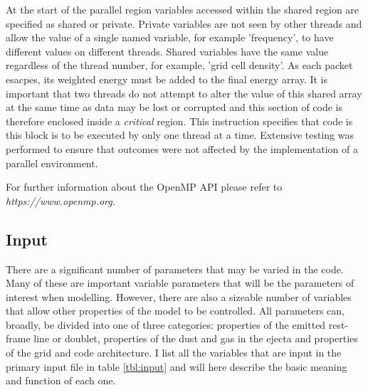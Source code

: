 	At the start of the parallel region variables accessed within the shared region are specified as shared or private.  Private variables are not seen by other threads and allow the value of a single named variable, for example 'frequency', to have different values on different threads.  Shared variables have the same value regardless of the thread number, for example, 'grid cell density'.  As each packet esacpes, its weighted energy must be added to the final energy array.  It is important that two threads do not attempt to alter the value of this shared array at the same time as data may be lost or corrupted and this section of code is therefore enclosed inside a \textit{critical} region.  This instruction specifies that code is this block is to be executed by only one thread at a time.  Extensive testing was performed to ensure that outcomes were not affected by the implementation of a parallel environment.
	
	For further information about the OpenMP API please refer to \textit{https://www.openmp.org}.
		
	\subsection{Input}
	
There are a significant number of parameters that may be varied in the code.  Many of these are important variable parameters that will be the parameters of interest when modelling.  However, there are also a sizeable number of variables that allow other properties of the model to be controlled.  All parameters can, broadly,  be divided into one of three categories:  properties of the emitted rest-frame line or doublet, properties of the dust and gas in the ejecta and properties of the grid and code architecture.  I list all the variables that are input in the primary input file in table \ref{tbl:input} and will here describe the basic meaning and function of each one.
	
